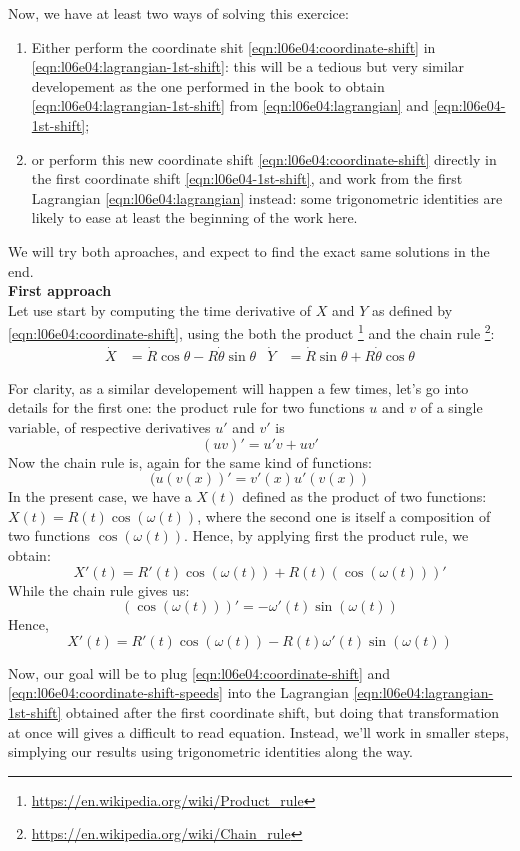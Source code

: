 \documentclass[solutions.tex]{subfiles}
\begin{document}
Now, we have at least two ways of solving this exercice:
\begin{enumerate}
	\item Either perform the coordinate shit \eqref{eqn:l06e04:coordinate-shift}
	in \eqref{eqn:l06e04:lagrangian-1st-shift}: this will be a tedious
	but very similar developement as the one performed in the book to obtain
	\eqref{eqn:l06e04:lagrangian-1st-shift} from \eqref{eqn:l06e04:lagrangian}
	and \eqref{eqn:l06e04-1st-shift};
	\item or perform this new coordinate shift \eqref{eqn:l06e04:coordinate-shift}
	directly in the first coordinate shift \eqref{eqn:l06e04-1st-shift}, and
	work from the first Lagrangian \eqref{eqn:l06e04:lagrangian} instead: some
	trigonometric identities are likely to ease at least the beginning of the
	work here.
\end{enumerate}
We will try both aproaches, and expect to find the exact same solutions in
the end. \\
\hr
\textbf{First approach}\\
Let use start by computing the time derivative of $X$ and $Y$ as defined
by \eqref{eqn:l06e04:coordinate-shift}, using the both the product
\footnote{\url{https://en.wikipedia.org/wiki/Product\_rule}}
and the chain rule
\footnote{\url{https://en.wikipedia.org/wiki/Chain\_rule}}:
\begin{align}
	\dot{X} &= \dot{R}\cos\theta - R\dot\theta\sin\theta
	& \dot{Y} &= \dot{R}\sin\theta + R\dot\theta\cos\theta
	\label{eqn:l06e04:coordinate-shift-speeds}
\end{align}

\begin{remark} For clarity, as a similar developement will happen
a few times, let's go into details for the first one:
the product rule for two functions $u$ and $v$ of a single variable, of
respective derivatives $u'$ and $v'$ is
\[ (u v)' = u'v+uv' \]
Now the chain rule is, again for the same kind of functions:
\[ (u(v(x))' = v'(x)u'(v(x)) \]
In the present case, we have a $X(t)$ defined as the product of two
functions: $X(t) = R(t)\cos(\omega(t))$, where the second one is
itself a composition of two functions $\cos(\omega(t))$. Hence,
by applying first the product rule, we obtain:
\[
	X'(t) = R'(t)\cos(\omega(t)) + R(t)\left(\cos(\omega(t))\right)'
\]
While the chain rule gives us:
\[
	(\cos(\omega(t)))' = -\omega'(t)\sin(\omega(t))
\]
Hence,
\[
	X'(t) = R'(t)\cos(\omega(t)) - R(t)\omega'(t)\sin(\omega(t))
\]
\end{remark}
Now, our goal will be to plug \eqref{eqn:l06e04:coordinate-shift} and
\eqref{eqn:l06e04:coordinate-shift-speeds} into the Lagrangian
\eqref{eqn:l06e04:lagrangian-1st-shift} obtained after the first
coordinate shift, but doing that transformation at once will gives
a difficult to read equation. Instead, we'll work in smaller steps,
simplying our results using trigonometric identities along the way. \\
\end{document}
